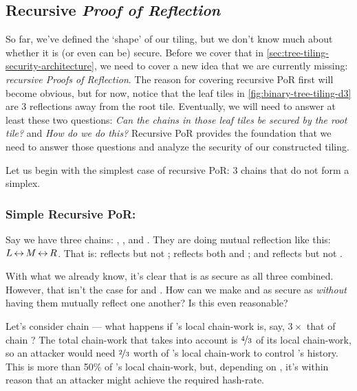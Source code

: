 
\subsection{Recursive \emph{Proof of Reflection}}

\label{sec:recursive-por}


So far, we've defined the `shape' of our tiling, but we don't know much about whether it is (or even can be) secure.
Before we cover that in \autoref{sec:tree-tiling-security-architecture}, we need to cover a new idea that we are currently missing: \emph{recursive Proofs of Reflection}.
The reason for covering recursive PoR first will become obvious, but for now, notice that the leaf tiles in \autoref{fig:binary-tree-tiling-d3} are 3 reflections away from the root tile.
Eventually, we will need to answer at least these two questions: \emph{Can the chains in those leaf tiles be secured by the root tile?} and \emph{How do we do this?}
Recursive PoR provides the foundation that we need to answer those questions and analyze the security of our constructed tiling.

Let us begin with the simplest case of recursive PoR: 3 chains that do not form a simplex.

\subsubsection{Simple Recursive PoR: }

Say we have three chains: \cL, \cM, and \cR.
They are doing mutual reflection like this: $\xymatrix@C=.85em@M=0em{{\cL} \; \ar@{<->}[r] & \; {\cM} \; \ar@{<->}[r] & \;{\cR}}$.
That is: \cL reflects \cM but not \cR; \cM reflects both \cL and \cR; and \cR reflects \cM but not \cL.

With what we already know, it's clear that \cM is as secure as all three combined.
However, that isn't the case for \cL and \cR.
How can we make \cL and \cR as secure as \cM \emph{without} having them mutually reflect one another?
Is this even reasonable?

Let's consider chain {\cL} --- what happens if \cL's local chain-work is, say, $3\times$ that of chain \cM?
The total chain-work that \cL takes into account is $\nicefrac43$ of its local chain-work, so an attacker would need $\nicefrac23$ worth of \cL's local chain-work to control \cL's history.
This is more than 50\% of \cL's local chain-work, but, depending on \cR, it's within reason that an attacker might achieve the required hash-rate.

